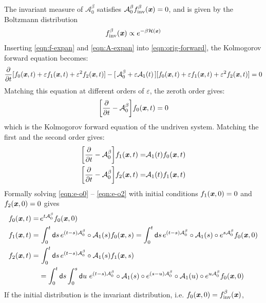 \documentclass[aip,jcp,a4paper,reprint,onecolumn]{revtex4-1}
\newcommand{\vect}[1]{\textbf{\textit{#1}}}
\newcommand{\dd}{\textsf{d}}
\newcommand{\inv}{\textrm{inv}}
\newcommand{\mh}{\mathcal H}
\newcommand{\eps}{\varepsilon}
\newcommand{\fwg}{{\mathcal A}}
\begin{document}
The invariant measure of $\fwg^\beta_0$ satisfies $\fwg^\beta_0f^\beta_{\inv}(\vect x) = 0$, and is given by the Boltzmann distribution
\begin{align}
  f^\beta_{\inv}(\vect x) \propto e^{-\beta\mh(\vect x)}
\end{align}
Inserting \eqref{eqn:f-expan} and \eqref{eqn:A-expan} into
\eqref{eqn:orig-forward}, 
the Kolmogorov forward equation becomes:
\begin{align}
  \frac{\partial}{\partial t}
  [f_0(\vect x, t) + \eps  f_1(\vect x, t) + \eps^2f_2(\vect x, t)]
  -
  [\,\fwg^\beta_0 + \eps\fwg_1(t)\,]
  [f_0(\vect x, t) + \eps  f_1(\vect x, t) + \eps^2f_2(\vect x, t)]
  = 0
\end{align}
Matching this equation at different orders of $\eps$, the zeroth
order gives:
\begin{align}\label{eqn:e-o0}
  \bigg[
  \frac{\partial}{\partial t}
  - \fwg_0^\beta
  \bigg]
  f_0(\vect x, t)
  = 0
\end{align}
which is the Kolmogorov forward equation of the undriven system. Matching the first and the second order gives:
\begin{align}\label{eqn:e-o1}
  \bigg[
  \frac{\partial}{\partial t}
  - \fwg_0^\beta
  \bigg]
  f_1(\vect x, t)
  =&
  \fwg_1(t) f_0(\vect x, t)\\\label{eqn:e-o2}
  \bigg[
  \frac{\partial}{\partial t}
  - \fwg_0^\beta
  \bigg]
  f_2(\vect x, t)
  =&
  \fwg_1(t) f_1(\vect x, t)
\end{align}
Formally solving \eqref{eqn:e-o0} -- \eqref{eqn:e-o2} with
initial conditions $f_1(\vect x, 0) = 0$ and $f_2(\vect x, 0) = 0$
gives
\begin{align}\label{eqn:f0-0}
  f_0(\vect x, t)
  =&\,
  e^{t\fwg^\beta_0}f_0(\vect x, 0) \\\label{eqn:f1-0}
  f_1(\vect x, t)
  =&\,
  \int_0^t\dd s\,
  e^{(t-s)\fwg^\beta_0}\circ
  \fwg_1(s) f_0(\vect x,s)
  =
  \int_0^t\dd s\,
  e^{(t-s)\fwg^\beta_0}\circ
  \fwg_1(s)\circ
  e^{s\fwg^\beta_0}f_0(\vect x, 0) \\\nonumber
  f_2(\vect x, t)
  =&\,
  \int_0^t\dd s\,
  e^{(t-s)\fwg^\beta_0}\circ
  \fwg_1(s) f_1(\vect x,s) \\\label{eqn:f2-0}
  &=
  \int_0^t\dd s
  \int_0^s\dd u\,\,
  e^{(t-s)\fwg^\beta_0}\circ
  \fwg_1(s)\circ
  e^{(s-u)\fwg^\beta_0}\circ
  \fwg_1(u)\circ
  e^{u\fwg^\beta_0}
  f_0(\vect x, 0) 
\end{align}
If the initial distribution is the invariant distribution, i.e.
$f_0(\vect x, 0) = f_{\inv}^\beta(\vect x)$,
\end{document}
